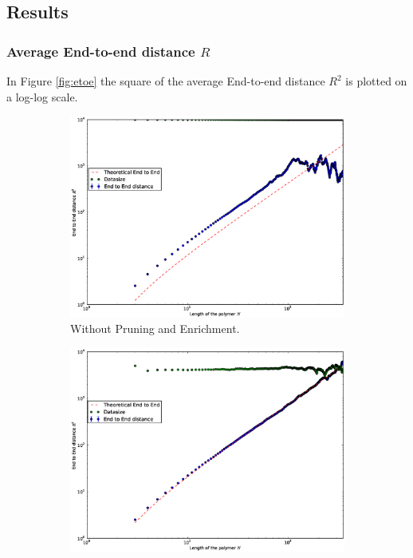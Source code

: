 \subsection*{Results}
\subsubsection*{Average End-to-end distance $R$}

In Figure \ref{fig:etoe} the square of the average End-to-end distance $R^2$ is plotted on a log-log scale.

\begin{figure}[htb]
        \centering
        \begin{subfigure}[b]{0.45\textwidth}
                \centering
                \includegraphics[width=\textwidth]{figures/N350_I10000_E2E_RR1}
                \caption{Without Pruning and Enrichment.}
                \label{fig:etoe_noprem}
        \end{subfigure}
	\quad
        \begin{subfigure}[b]{0.45\textwidth}
                \centering
                \includegraphics[width=\textwidth]{figures/N350_E2E_PERM1}

\end{subfigure}
\end{figure}
